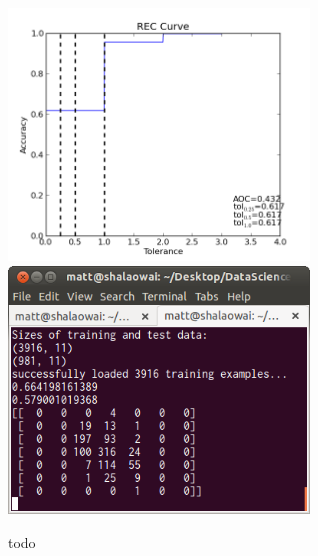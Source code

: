 \documentclass[11pt]{article}
\begin{document}
\begin{figure}[h]
  \centering
  \includegraphics[width=8cm]{RECtrain.png}
  \includegraphics[width=8cm]{Confusion_Final.png}
  \caption{todo}
  \label{fig:todo}
\end{figure}
\end{document}
